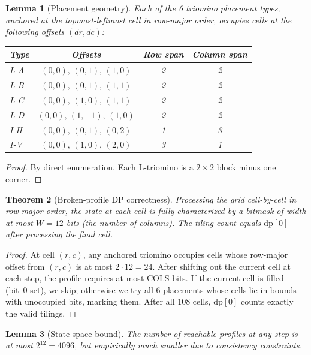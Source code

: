 \documentclass[12pt]{article}
\newtheorem{theorem}{Theorem}
\newtheorem{lemma}[theorem]{Lemma}
\theoremstyle{definition}
\begin{document}
\begin{lemma}[Placement geometry]
Each of the 6 triomino placement types, anchored at the topmost-leftmost cell in row-major order, occupies cells at the following offsets $(dr, dc)$:
\begin{center}
\begin{tabular}{@{}lccc@{}}
\toprule
Type & Offsets & Row span & Column span \\
\midrule
L-A  & $(0,0),\,(0,1),\,(1,0)$ & 2 & 2 \\
L-B  & $(0,0),\,(0,1),\,(1,1)$ & 2 & 2 \\
L-C  & $(0,0),\,(1,0),\,(1,1)$ & 2 & 2 \\
L-D  & $(0,0),\,(1,-1),\,(1,0)$ & 2 & 2 \\
I-H  & $(0,0),\,(0,1),\,(0,2)$ & 1 & 3 \\
I-V  & $(0,0),\,(1,0),\,(2,0)$ & 3 & 1 \\
\bottomrule
\end{tabular}
\end{center}
\end{lemma}

\begin{proof}
By direct enumeration. Each L-triomino is a $2 \times 2$ block minus one corner.
\end{proof}

\begin{theorem}[Broken-profile DP correctness]
Processing the grid cell-by-cell in row-major order, the state at each cell is fully characterized by a bitmask of width at most $W = 12$ bits (the number of columns). The tiling count equals $\mathrm{dp}[0]$ after processing the final cell.
\end{theorem}

\begin{proof}
At cell $(r,c)$, any anchored triomino occupies cells whose row-major offset from $(r,c)$ is at most $2 \cdot 12 = 24$. After shifting out the current cell at each step, the profile requires at most $\mathrm{COLS}$ bits. If the current cell is filled (bit~0 set), we skip; otherwise we try all 6 placements whose cells lie in-bounds with unoccupied bits, marking them. After all 108 cells, $\mathrm{dp}[0]$ counts exactly the valid tilings.
\end{proof}

\begin{lemma}[State space bound]
The number of reachable profiles at any step is at most $2^{12} = 4096$, but empirically much smaller due to consistency constraints.
\end{lemma}
\end{document}
